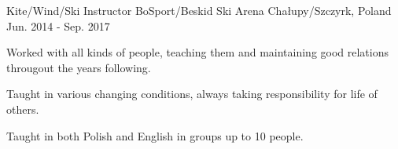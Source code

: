\begin{cventries}
  \cventry
    {Kite/Wind/Ski Instructor} %
    {BoSport/Beskid Ski Arena} %
    {Chałupy/Szczyrk, Poland} %
    {Jun. 2014 - Sep. 2017} %
    {
      \begin{cvitems} %
        \item {Worked with all kinds of people, teaching them and maintaining good relations througout the years following.}
        \item {Taught in various changing conditions, always taking responsibility for life of others.}
        \item {Taught in both Polish and English in groups up to 10 people.}
      \end{cvitems}
    }

\end{cventries}
